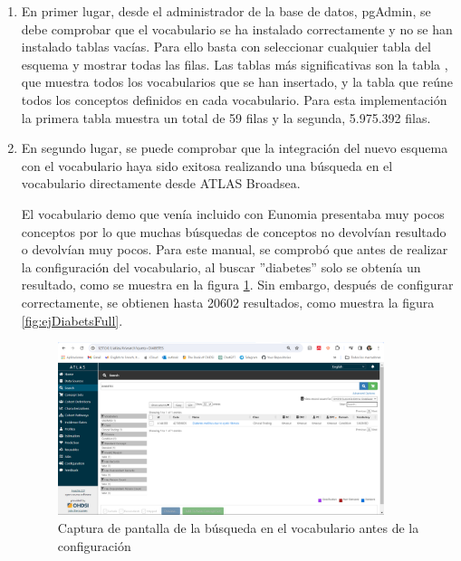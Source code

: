 \begin{enumerate}

    \item En primer lugar, desde el administrador de la base de datos, pgAdmin, se debe comprobar que el vocabulario se ha instalado correctamente y no se han instalado tablas vacías. Para ello basta con seleccionar cualquier tabla del esquema  y mostrar todas las filas. Las tablas más significativas son la tabla , que muestra todos los vocabularios que se han insertado, y la tabla  que reúne todos los conceptos definidos en cada vocabulario. Para esta implementación la primera tabla muestra un total de 59 filas y la segunda, 5.975.392 filas.

    \item En segundo lugar, se puede comprobar que la integración del nuevo esquema con el vocabulario haya sido exitosa realizando una búsqueda en el vocabulario directamente desde ATLAS Broadsea. 
    
    El vocabulario demo que venía incluido con Eunomia presentaba muy pocos conceptos por lo que muchas búsquedas de conceptos no devolvían resultado o devolvían muy pocos. Para este manual, se comprobó que antes de realizar la configuración del vocabulario, al buscar ''diabetes'' solo se obtenía un resultado, como se muestra en la figura \ref{fig:ejDiabetesVacio}. Sin embargo, después de configurar correctamente, se obtienen hasta 20602 resultados, como muestra la figura \ref{fig:ejDiabetsFull}.

        \begin{figure}[H]
        \centering
        \includegraphics[width=0.90\textwidth]{figures/ejDiabetesVacio.png}
        \caption{Captura de pantalla de la búsqueda en el vocabulario antes de la configuración}
        \label{fig:ejDiabetesVacio}
    \end{figure}


\end{enumerate}
